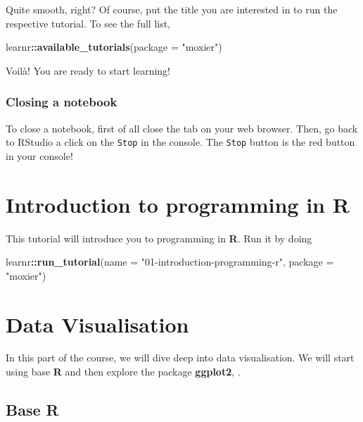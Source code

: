 \documentclass[]{book}
\newenvironment{Shaded}{\begin{snugshade}}{\end{snugshade}}
\newcommand{\KeywordTok}[1]{\textcolor[rgb]{0.13,0.29,0.53}{\textbf{#1}}}
\newcommand{\DataTypeTok}[1]{\textcolor[rgb]{0.13,0.29,0.53}{#1}}
\newcommand{\StringTok}[1]{\textcolor[rgb]{0.31,0.60,0.02}{#1}}
\newcommand{\OperatorTok}[1]{\textcolor[rgb]{0.81,0.36,0.00}{\textbf{#1}}}
\newcommand{\NormalTok}[1]{#1}
\begin{document}
Quite smooth, right? Of course, put the title you are interested in to
run the respective tutorial. To see the full list,

\begin{Shaded}
\begin{Highlighting}[]
\NormalTok{learnr}\OperatorTok{::}\KeywordTok{available_tutorials}\NormalTok{(}\DataTypeTok{package =} \StringTok{"moxier"}\NormalTok{)}
\end{Highlighting}
\end{Shaded}

Voilà! You are ready to start learning!

\subsection{Closing a notebook}\label{closing-a-notebook}

To close a notebook, first of all close the tab on your web browser.
Then, go back to RStudio a click on the \texttt{Stop} in the console.
The \texttt{Stop} button is the red button in your console!

\chapter{Introduction to programming in
R}\label{introduction-to-programming-in-r}

This tutorial will introduce you to programming in \textbf{R}. Run it by
doing

\begin{Shaded}
\begin{Highlighting}[]
\NormalTok{learnr}\OperatorTok{::}\KeywordTok{run_tutorial}\NormalTok{(}\DataTypeTok{name =} \StringTok{"01-introduction-programming-r"}\NormalTok{,}
                     \DataTypeTok{package =} \StringTok{"moxier"}\NormalTok{)}
\end{Highlighting}
\end{Shaded}

\chapter{Data Visualisation}\label{data-visualisation}

In this part of the course, we will dive deep into data visualisation.
We will start using base \textbf{R} and then explore the package
\textbf{ggplot2}, \citep{R-ggplot2}.

\section{\texorpdfstring{Base \textbf{R}}{Base R}}\label{base-r}
\end{document}
